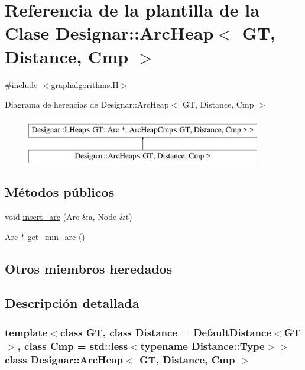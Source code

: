 \hypertarget{class_designar_1_1_arc_heap}{}\section{Referencia de la plantilla de la Clase Designar\+:\+:Arc\+Heap$<$ GT, Distance, Cmp $>$}
\label{class_designar_1_1_arc_heap}


{\ttfamily \#include $<$graphalgorithms.\+H$>$}

Diagrama de herencias de Designar\+:\+:Arc\+Heap$<$ GT, Distance, Cmp $>$\begin{figure}[H]
\begin{center}
\leavevmode
\includegraphics[height=2.000000cm]{class_designar_1_1_arc_heap}
\end{center}
\end{figure}
\subsection*{Métodos públicos}
\begin{DoxyCompactItemize}
\item 
void \hyperlink{class_designar_1_1_arc_heap_a578a5310c000e671cb967799317f534d}{insert\+\_\+arc} (Arc \&a, Node \&t)
\item 
Arc $\ast$ \hyperlink{class_designar_1_1_arc_heap_aa97981f64e6a7868d4d8b310bfd6b1cb}{get\+\_\+min\+\_\+arc} ()
\end{DoxyCompactItemize}
\subsection*{Otros miembros heredados}


\subsection{Descripción detallada}
\subsubsection*{template$<$class GT, class Distance = Default\+Distance$<$\+G\+T$>$, class Cmp = std\+::less$<$typename Distance\+::\+Type$>$$>$\newline
class Designar\+::\+Arc\+Heap$<$ G\+T, Distance, Cmp $>$}



